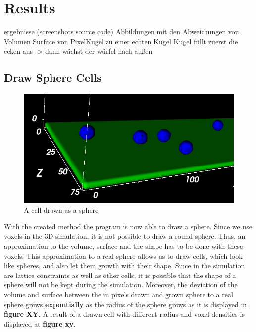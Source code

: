 \chapter{Results}
ergebnisse (screenshots \/ source code) \newline
Abbildungen mit den Abweichungen von Volumen Surface von PixelKugel zu einer echten Kugel \newline
Kugel füllt zuerst die ecken aus -> dann wächst der würfel nach außen

\section{Draw Sphere Cells}
\begin{figure}
	\center
	\includegraphics[scale=0.6]{figures/DrawnSphereCell.png}
	\caption{A cell drawn as a sphere}
	\label{img:DrawnSphereCell}
\end{figure}
With the created method the program is now able to draw a sphere. Since we use voxels in the 3D simulation, it is not possible to draw a round sphere. Thus, an approximation to the volume, surface and the shape has to be done with these voxels. This approximation to a real sphere allows us to draw cells, which look like spheres, and also let them growth with their shape. Since in the simulation are lattice constraints as well as other cells, it is possible that the shape of a sphere will not be kept during the simulation. Moreover, the deviation of the volume and surface between the in pixels drawn and grown sphere to a real sphere grows \textbf{expontially} as the radius of the sphere grows as it is displayed in \textbf{figure XY}.
A result of a drawn cell with different radius and voxel densities is displayed at \textbf{figure xy}.


